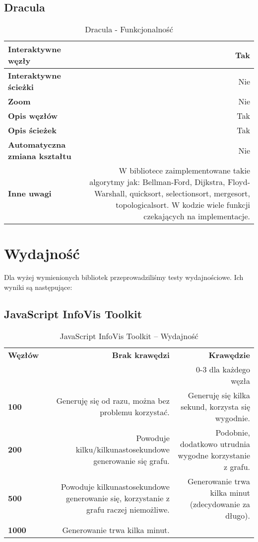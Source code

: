 \subsection{Dracula}

\begin{table}[H]
\begin{tabularx}{\textwidth}{ ||l|R|| }
\hline
\textbf{Interaktywne węzły} & Tak \\
\hline
\textbf{Interaktywne ścieżki} & Nie \\
\hline
\textbf{Zoom} & Nie \\
\hline
\textbf{Opis węzłów} & Tak \\
\hline
\textbf{Opis ścieżek} & Tak \\
\hline
\textbf{Automatyczna zmiana kształtu} & Nie \\
\hline
\textbf{Inne uwagi} & W bibliotece zaimplementowane takie algorytmy jak: Bellman-Ford, Dijkstra, Floyd-Warshall, quicksort, selectionsort, mergesort, topologicalsort. W kodzie wiele funkcji czekających na implementacje.\\
\hline
\end{tabularx}
\caption{Dracula - Funkcjonalność}
\end{table}


\section{Wydajność}
Dla wyżej wymienionych bibliotek przeprowadziliśmy testy wydajnościowe. Ich wyniki są następujące:

\subsection{JavaScript InfoVis Toolkit}

\begin{table}[H]
\begin{tabularx}{\textwidth}{ ||l|R|R|| }
\hline
\textbf{Węzłów} & \textbf{Brak krawędzi} & \textbf{Krawędzie} \\
 &  & 0-3 dla każdego węzła \\
\hline
\textbf{100} & Generuję się od razu, można bez problemu korzystać. & Generuję się kilka sekund, korzysta się wygodnie. \\
\hline
\textbf{200} & Powoduje kilku/kilkunastosekundowe generowanie się grafu. & Podobnie, dodatkowo utrudnia wygodne korzystanie z grafu.	 \\
\hline
\textbf{500} & Powoduje kilkunastosekundowe generowanie się, korzystanie z grafu raczej niemożliwe. & Generowanie trwa kilka minut (zdecydowanie za długo).	 \\
\hline
\textbf{1000} & Generowanie trwa kilka minut. &  \\
\hline
\end{tabularx}
\caption{JavaScript InfoVis Toolkit -- Wydajność}
\end{table}


